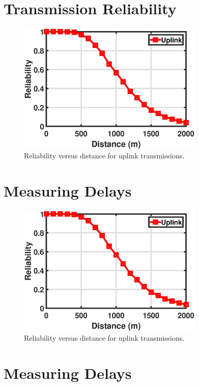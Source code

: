 \documentclass{article}
\begin{document}
\section{Transmission Reliability}

\begin{figure}[h]
\centering
\includegraphics[width=3.5in]{p3_uplink.eps}
\caption{Reliability versus distance for uplink transmissions.}
\end{figure}

\section{Measuring Delays}
\begin{figure}[h]
\centering
\includegraphics[width=3.5in]{p3_uplink.eps}
\caption{Reliability versus distance for uplink transmissions.}
\end{figure}

\section{Measuring Delays}
\end{document}

